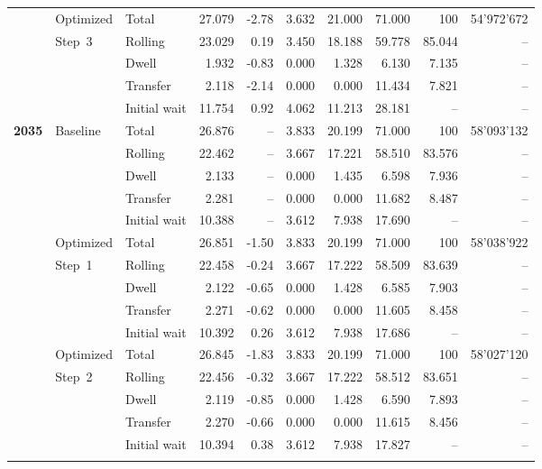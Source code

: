 \documentclass[preprint,12pt]{elsarticle}
\begin{document}
\begin{table}[htbp]
{\begin{tabular}{lllrrrrrrr}
 & Optimized  & Total & 27.079 & -2.78 & 3.632 & 21.000 & 71.000 & 100 & 54'972'672\\
     &        Step~3          & Rolling & 23.029 & 0.19 & 3.450 & 18.188 & 59.778 & 85.044 & --  \\
     &                  & Dwell & 1.932 & -0.83 & 0.000 & 1.328 & 6.130 & 7.135 & --  \\
     &                  & Transfer & 2.118 & -2.14 & 0.000 & 0.000 & 11.434 & 7.821 & --  \\
     &                  & Initial wait & 11.754 & 0.92 & 4.062 & 11.213 & 28.181 & -- & --  \\

\midrule

\textbf{2035} & Baseline & Total & 26.876 & -- & 3.833 & 20.199 & 71.000 & 100 & 58'093'132 \\
     &          & Rolling & 22.462 &  --& 3.667 & 17.221 & 58.510 & 83.576 & --  \\
     &          & Dwell & 2.133 &-- & 0.000 & 1.435 & 6.598 & 7.936 & --  \\
     &          & Transfer & 2.281 &  --& 0.000 & 0.000 & 11.682 & 8.487 & --  \\
     &          & Initial wait & 10.388 &-- & 3.612 & 7.938 & 17.690 & -- & --  \\
\addlinespace

 & Optimized  & Total & 26.851 & -1.50 & 3.833 & 20.199 & 71.000 & 100 & 58'038'922  \\
     &        Step~1          & Rolling & 22.458 & -0.24 & 3.667 & 17.222 & 58.509 & 83.639 & --  \\
     &                  & Dwell & 2.122 & -0.65 & 0.000 & 1.428 & 6.585 & 7.903 & -- \\
     &                  & Transfer & 2.271 & -0.62 & 0.000 & 0.000 & 11.605 & 8.458 & --  \\
     &                  & Initial wait & 10.392 & 0.26 & 3.612 & 7.938 & 17.686 & -- & --\\
\addlinespace

 & Optimized  & Total & 26.845 & -1.83 & 3.833 & 20.199 & 71.000 & 100 & 58'027'120  \\
     &       Step~2           & Rolling & 22.456 & -0.32 & 3.667 & 17.222 & 58.512 & 83.651 & --  \\
     &                  & Dwell & 2.119 & -0.85 & 0.000 & 1.428 & 6.590 & 7.893 & --  \\
     &                  & Transfer & 2.270 & -0.66 & 0.000 & 0.000 & 11.615 & 8.456 & --  \\
     &                  & Initial wait & 10.394 & 0.38 & 3.612 & 7.938 & 17.827 & -- & --  \\
\addlinespace


\end{tabular}}
\end{table}
\end{document}
